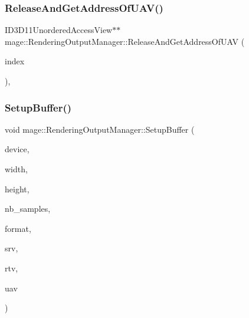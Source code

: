 \subsubsection{\texorpdfstring{Release\+And\+Get\+Address\+Of\+U\+A\+V()}{ReleaseAndGetAddressOfUAV()}}
{\footnotesize\ttfamily I\+D3\+D11\+Unordered\+Access\+View$\ast$$\ast$ mage\+::\+Rendering\+Output\+Manager\+::\+Release\+And\+Get\+Address\+Of\+U\+AV (\begin{DoxyParamCaption}\item[{\hyperlink{classmage_1_1_rendering_output_manager_a34cdd58dd0dda9d78878d79aa3393b89}{U\+A\+V\+Index}}]{index }\end{DoxyParamCaption})\hspace{0.3cm}{\ttfamily [private]}, {\ttfamily [noexcept]}}

\hypertarget{classmage_1_1_rendering_output_manager_a4170300a908e46623e4eed3baf16570f}{}\label{classmage_1_1_rendering_output_manager_a4170300a908e46623e4eed3baf16570f} 
\subsubsection{\texorpdfstring{Setup\+Buffer()}{SetupBuffer()}}
{\footnotesize\ttfamily void mage\+::\+Rendering\+Output\+Manager\+::\+Setup\+Buffer (\begin{DoxyParamCaption}\item[{I\+D3\+D11\+Device5 $\ast$}]{device,  }\item[{\hyperlink{namespacemage_a41c104c036fba3756a74e19f793eeaa1}{U32}}]{width,  }\item[{\hyperlink{namespacemage_a41c104c036fba3756a74e19f793eeaa1}{U32}}]{height,  }\item[{\hyperlink{namespacemage_a41c104c036fba3756a74e19f793eeaa1}{U32}}]{nb\+\_\+samples,  }\item[{D\+X\+G\+I\+\_\+\+F\+O\+R\+M\+AT}]{format,  }\item[{I\+D3\+D11\+Shader\+Resource\+View $\ast$$\ast$}]{srv,  }\item[{I\+D3\+D11\+Render\+Target\+View $\ast$$\ast$}]{rtv,  }\item[{I\+D3\+D11\+Unordered\+Access\+View $\ast$$\ast$}]{uav }\end{DoxyParamCaption})\hspace{0.3cm}{\ttfamily [private]}}

